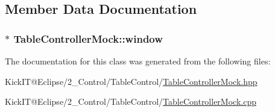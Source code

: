 \subsection{Member Data Documentation}
\subsubsection[{\texorpdfstring{window}{window}}]{$\ast$ Table\+Controller\+Mock\+::window\hspace{0.3cm}{\ttfamily [protected]}}\hypertarget{class_table_controller_mock_ac0605354b807b152e8c70ec8957f6ccd}{}\label{class_table_controller_mock_ac0605354b807b152e8c70ec8957f6ccd}


The documentation for this class was generated from the following files\+:\begin{DoxyCompactItemize}
\item 
Kick\+I\+T@\+Eclipse/2\+\_\+\+Control/\+Table\+Control/\hyperlink{_table_controller_mock_8hpp}{Table\+Controller\+Mock.\+hpp}\item 
Kick\+I\+T@\+Eclipse/2\+\_\+\+Control/\+Table\+Control/\hyperlink{_table_controller_mock_8cpp}{Table\+Controller\+Mock.\+cpp}\end{DoxyCompactItemize}
